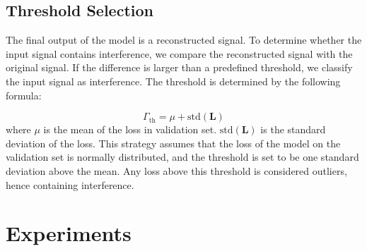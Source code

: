 \documentclass[conference]{IEEEtran}
\begin{document}
\subsection{Threshold Selection}

The final output of the model is a reconstructed signal. To determine whether the input signal contains interference, we compare the reconstructed signal with the original signal. If the difference is larger than a predefined threshold, we classify the input signal as interference. The threshold is determined by the following formula:

\begin{equation}
    \Gamma_{\text{th}} = \mu + \text{std}(\mathbf{L})
\end{equation}
where $\mu$ is the mean of the loss in validation set.  $\text{std}(\mathbf{L})$ is the standard deviation of the loss. This strategy assumes that the loss of the model on the validation set is normally distributed, and the threshold is set to be one standard deviation above the mean. Any loss above this threshold is considered outliers, hence containing interference.



\section{Experiments}
\label{sec:experiments}



\end{document}
